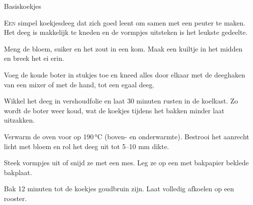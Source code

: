\begin{recipe}{Basiskoekjes}


\lettrine{E}{en} simpel koekjesdeeg dat zich goed leent om samen met een peuter
te maken. Het deeg is makkelijk te kneden en de vormpjes uitsteken is het leukste
gedeelte.

\begin{ingredients}
\end{ingredients}

\begin{steps}
  \item Meng de bloem, suiker en het zout in een kom. Maak een kuiltje in het
        midden en breek het ei erin.
  \item Voeg de koude boter in stukjes toe en kneed alles door elkaar met de
        deeghaken van een mixer of met de hand, tot een egaal deeg.
  \item Wikkel het deeg in vershoudfolie en laat 30 minuten rusten in de koelkast.
        Zo wordt de boter weer koud, wat de koekjes tijdens het bakken minder
        laat uitzakken.
  \item Verwarm de oven voor op 190\,°C (boven- en onderwarmte). Bestrooi het aanrecht licht met bloem
        en rol het deeg uit tot 5--10 mm dikte.
  \item Steek vormpjes uit of snijd ze met een mes. Leg ze op een met bakpapier
        beklede bakplaat.
  \item Bak 12 minuten tot de koekjes goudbruin zijn. Laat volledig afkoelen op
        een rooster.
\end{steps}
\end{recipe}
